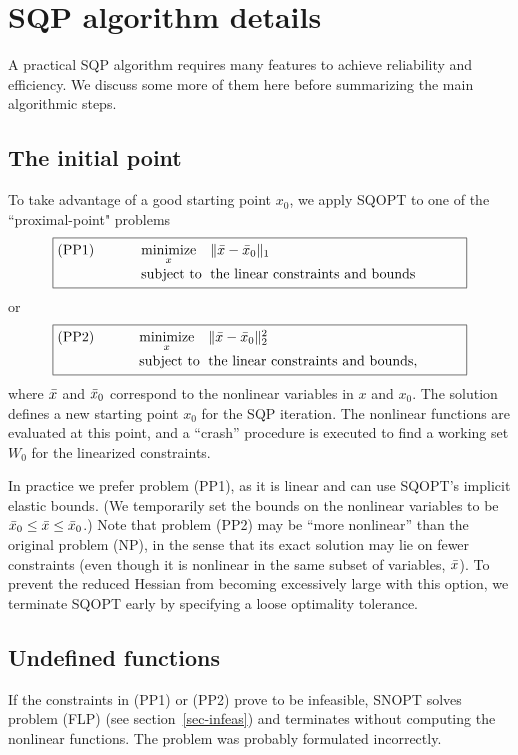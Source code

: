 \documentclass[draft,leqno,onefignum,onetabnum]{siamltex}
\makeatletter
\def\minim{\mathop{\hbox{\rm minimize}}}
\def\minimize#1{{\displaystyle\minim_{#1}}}
\def\norm#1{\|#1\|}
\def\subject{\mbox{\rm subject to}}
\def\xbar{\skew{2.8}\bar x}
\def\SNOPT {{\small SNOPT}}
\def\SQOPT {{\small SQOPT}}
\def\problem#1#2#3#4{\fbox
   {\begin{tabular*}{0.84\textwidth}
    {@{}l@{\extracolsep{\fill}}l@{\extracolsep{6pt}}l@{\extracolsep{\fill}}c@{}}
      #1 & $\minimize{#2}$ & $#3$ & $ $ \\[5pt]
         & $\subject$      & $#4$ & $ $
    \end{tabular*}}}
\newcommand{\twonorm}[1]{\norm{#1}_2}
\newcommand{\onenorm}[1]{\norm{#1}_1}
\makeatother
\begin{document}
\section{SQP algorithm details} \label{sec-details}

A practical SQP algorithm requires many features to achieve
reliability and efficiency.  We discuss some more of them here
before summarizing the main algorithmic steps.


\subsection{The initial point} \label{sec-x0}

To take advantage of a good starting point $x_0$, we apply
\SQOPT{} to one of the ``proximal-point" problems
$$
   \problem{(PP1)}{x}{\onenorm{\xbar - \xbar_0}}
               {\hbox{the linear constraints and bounds}}
$$
or
$$
   \problem{(PP2)}{x}{\twonorm{\xbar - \xbar_0}^2}
               {\hbox{the linear constraints and bounds},}
$$
where $\xbar$ and $\xbar_0$ correspond to the nonlinear variables in $x$
and $x_0$.  The solution defines a new starting point $x_0$ for the SQP
iteration.  The nonlinear functions are evaluated at this point, and a
``crash'' procedure is executed to find a working set $W_0$ for the
linearized constraints.

In practice we prefer problem (PP1), as it is linear and can use \SQOPT's
implicit elastic bounds. (We temporarily set the bounds on the nonlinear
variables to be $\xbar_0 \le \xbar \le \xbar_0$.)  Note that problem (PP2)
may be ``more nonlinear'' than the original problem (NP), in the sense that
its exact solution may lie on fewer constraints (even though it is
nonlinear in the same subset of variables, $\xbar$).  To prevent the
reduced Hessian from becoming excessively large with this option, we
terminate \SQOPT{} early by specifying a loose optimality tolerance.


\subsection{Undefined functions} \label{sec-undefined-f}

  If the constraints in (PP1) or (PP2) prove to be infeasible, \SNOPT{} solves
problem (FLP) (see section~\ref{sec-infeas}) and terminates without computing
the nonlinear functions.  The problem was probably formulated incorrectly.
\end{document}
